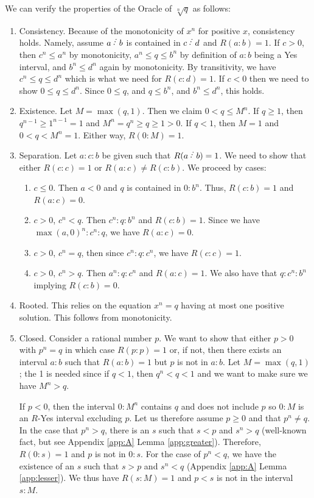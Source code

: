 \documentclass[12pt]{article}
\begin{document}
We can verify the properties of the Oracle of $\sqrt[n]{q}$ as follows: 

\begin{enumerate}
    \item Consistency. Because of the monotonicity of $x^n$ for positive $x$, consistency holds. Namely, assume $a\lte b$ is contained in $c \lte d$ and $R(a:b)=1$. If $c>0$, then $c^n \leq a^n$ by monotonicity,  $a^n \leq q \leq b^n$ by definition of $a:b$ being a Yes interval, and $b^n \leq d^n$ again by monotonicity. By transitivity, we have $c^n \leq q \leq d^n$ which is what we need for $R(c:d) = 1$.  If $c<0$ then we need to show $0 \leq q \leq d^n$. Since $0 \leq q$, and $q \leq  b^n$, and $b^n \leq d^n$, this holds. 
    \item Existence. Let $M = \max(q, 1)$. Then we claim $0 < q \leq M^n$. If $q \geq 1$, then $q^{n-1} \geq 1^{n-1} = 1$ and $M^n = q^n \geq q \geq 1 > 0$. If $ q < 1$, then $M=1$ and $0 < q < M^n = 1$. Either way, $R(0:M) = 1$. 
    \item Separation. Let $a: c: b$ be given such that $R(a \lte b)=1$. We need to show that either $R(c:c) = 1$ or $R(a:c) \neq R(c:b)$. We proceed by cases:
    \begin{enumerate}
        \item $c \leq 0$. Then $a<0$ and $q$ is contained in $0:b^n$. Thus, $R(c:b) = 1$ and $R(a:c) = 0$. 
        \item $c>0$, $c^n <q$. Then $c^n:q:b^n$ and $R(c:b)=1$. Since we have $\max(a, 0)^n :c^n:q$, we have $R(a:c)=0$. 
        \item $c>0$, $c^n = q$, then since $c^n : q : c^n$, we have $R(c:c) =1$.
        \item $c>0$, $c^n > q$. Then $a^n:q:c^n$ and $R(a:c) = 1$. We also have that $q:c^n:b^n$ implying $R(c:b)=0$.
    \end{enumerate}
     \item Rooted. This relies on the equation $x^n = q$ having at most one positive solution. This follows from monotonicity. 
    \item Closed. Consider a rational number $p$. We want to show that either $p>0$ with $p^n = q$ in which case $R(p:p)=1$ or, if not, then there exists an interval $a:b$ such that $R(a:b)=1$ but $p$ is not in $a:b$. Let $M = \max(q, 1)$; the 1 is needed since if $q<1$, then $q^n < q < 1$ and we want to make sure we have $M^n > q$.
    
    If $p < 0$, then the interval $0:M^n$ contains $q$ and does not include $p$ so $0:M$ is an $R$-Yes interval excluding $p$. Let us therefore assume $p \geq 0$ and that $p^n \neq q$. In the case that $p^n > q$, there is an $s$ such that $s<p$ and $s^n > q$ (well-known fact, but see Appendix \ref{app:A} Lemma \ref{app:greater}). Therefore, $R(0:s) = 1$ and $p$ is not in $0:s$. For the case of $p^n < q$, we have the existence of an $s$ such that $s > p$ and $s^n < q$ (Appendix \ref{app:A} Lemma \ref{app:lesser}). We thus have $R(s:M)=1$ and $p < s$ is not in the interval $s:M$.
    
\end{enumerate}
\end{document}
